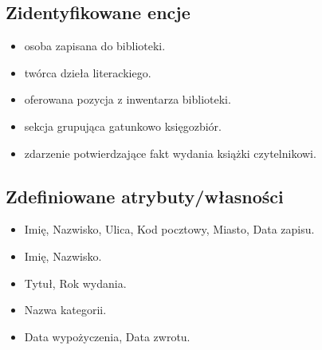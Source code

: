 \documentclass[letterpaper,10pt,english]{sphinxmanual}
\begin{document}
\subsection{Zidentyfikowane encje}
\label{\detokenize{rozdzial_3/index:zidentyfikowane-encje}}\begin{itemize}
\item {} 
\sphinxAtStartPar
{} \sphinxhyphen{} osoba zapisana do biblioteki.

\item {} 
\sphinxAtStartPar
{} \sphinxhyphen{} twórca dzieła literackiego.

\item {} 
\sphinxAtStartPar
{} \sphinxhyphen{} oferowana pozycja z inwentarza biblioteki.

\item {} 
\sphinxAtStartPar
{} \sphinxhyphen{} sekcja grupująca gatunkowo księgozbiór.

\item {} 
\sphinxAtStartPar
{} \sphinxhyphen{} zdarzenie potwierdzające fakt wydania książki czytelnikowi.

\end{itemize}


\subsection{Zdefiniowane atrybuty/własności}
\label{\detokenize{rozdzial_3/index:zdefiniowane-atrybuty-wlasnosci}}\begin{itemize}
\item {} 
\sphinxAtStartPar
{} Imię, Nazwisko, Ulica, Kod pocztowy, Miasto, Data zapisu.

\item {} 
\sphinxAtStartPar
{} Imię, Nazwisko.

\item {} 
\sphinxAtStartPar
{} Tytuł, Rok wydania.

\item {} 
\sphinxAtStartPar
{} Nazwa kategorii.

\item {} 
\sphinxAtStartPar
{} Data wypożyczenia, Data zwrotu.

\end{itemize}
\end{document}
